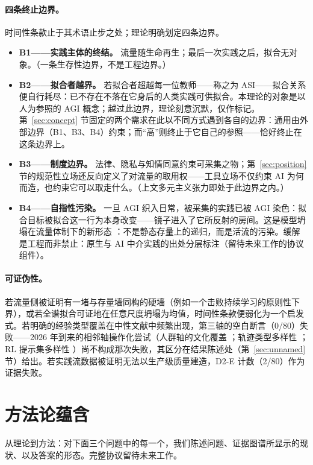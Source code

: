\documentclass[10pt,fontset=fandol]{ctexart}
\begin{document}
\paragraph{四条终止边界。}
时间性条款止于其术语止步之处；理论明确划定四条边界。
\begin{itemize}
\item \textbf{B1——实践主体的终结。} 流量随生命再生；最后一次实践之后，拟合无对象。（一条生存性边界，不是工程边界。）
\item \textbf{B2——拟合者越界。} 若拟合者超越每一位教师——称之为 ASI——拟合关系便自行耗尽：已不存在不落在它身后的人类实践可供拟合。本理论的对象是以人为参照的 AGI 概念；越过此边界，理论刻意沉默，仅作标记。第~\ref{sec:concept} 节固定的两个需求在此以不同方式遇到各自的边界：通用由外部边界（B1、B3、B4）约束；而“高”则终止于它自己的参照——恰好终止在这条边界上。
\item \textbf{B3——制度边界。} 法律、隐私与知情同意约束可采集之物；第~\ref{sec:position} 节的规范性立场还反向定义了对流量的取用权——工具立场不仅约束 AI 为何而造，也约束它可以取走什么。（上文多元主义张力即处于此边界之内。）
\item \textbf{B4——自指性污染。} 一旦 AGI 织入日常，被采集的实践已被 AGI 染色：拟合目标被拟合这一行为本身改变——镜子进入了它所反射的房间。这是模型坍塌在流量体制下的新形态 \cite{shumailov2024collapse}：不是静态存量上的递归，而是活流的污染。缓解是工程而非禁止：原生与 AI 中介实践的出处分层标注（留待未来工作的协议组件）。
\end{itemize}

\paragraph{可证伪性。}
若流量侧被证明有一堵与存量墙同构的硬墙（例如一个击败持续学习的原则性下界），或若全谱拟合可证地在任意尺度坍塌为均值，时间性条款便弱化为一个启发式。若明确的经验类型覆盖在中性文献中频繁出现，第三轴的空白断言（0/80）失败——2026 年到来的相邻轴操作化尝试（人群轴的文化覆盖 \cite{sahu2026culturefunnel}；轨迹类型多样性 \cite{fu2026tjpo}；RL 提示集多样性 \cite{jin2025entropy}）尚不构成那次失败，其区分在结果陈述处（第~\ref{sec:unnamed} 节）给出。若实践流数据被证明无法以生产级质量建造，D2-E 计数（2/80）作为证据失败。

\section{方法论蕴含}\label{sec:implications}

从理论到方法：对下面三个问题中的每一个，我们陈述问题、证据图谱所显示的现状、以及答案的形态。完整协议留待未来工作。
\end{document}
